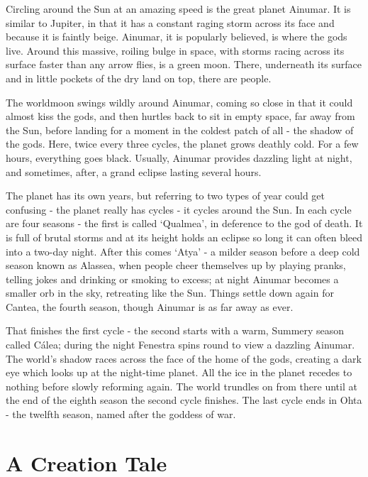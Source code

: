 Circling around the Sun at an amazing speed is the great planet Ainumar.  It is similar to Jupiter, in that it has a constant raging storm across its face and because it is faintly beige.  Ainumar, it is popularly believed, is where the gods live.  Around this massive, roiling bulge in space, with storms racing across its surface faster than any arrow flies, is a green moon.  There, underneath its surface and in little pockets of the dry land on top, there are people.

	The worldmoon swings wildly around Ainumar, coming so close in that it could almost kiss the gods, and then hurtles back to sit in empty space, far away from the Sun, before landing for a moment in the coldest patch of all - the shadow of the gods.  Here, twice every three cycles, the planet grows deathly cold.  For a few hours, everything goes black.  Usually, Ainumar provides dazzling light at night, and sometimes, after, a grand eclipse lasting several hours.

	The planet has its own years, but referring to two types of year could get confusing - the planet really has cycles - it cycles around the Sun.  In each cycle are four seasons - the first is called `Qualmea', in deference to the god of death.  It is full of brutal storms and at its height holds an eclipse so long it can often bleed into a two-day night.  After this comes `Atya' - a milder season before a deep cold season known as Alassea, when people cheer themselves up by playing pranks, telling jokes and drinking or smoking to excess; at night Ainumar becomes a smaller orb in the sky, retreating like the Sun.  Things settle down again for Cantea, the fourth season, though Ainumar is as far away as ever.

That finishes the first cycle - the second starts with a warm, Summery season called C\'{a}lea; during the night Fenestra spins round to view a dazzling Ainumar.  The world's shadow races across the face of the home of the gods, creating a dark eye which looks up at the night-time planet.  All the ice in the planet recedes to nothing before slowly reforming again.  The world trundles on from there until at the end of the eighth season the second cycle finishes.  The last cycle ends in Ohta - the twelfth season, named after the goddess of war.

\chapter{A Creation Tale}

